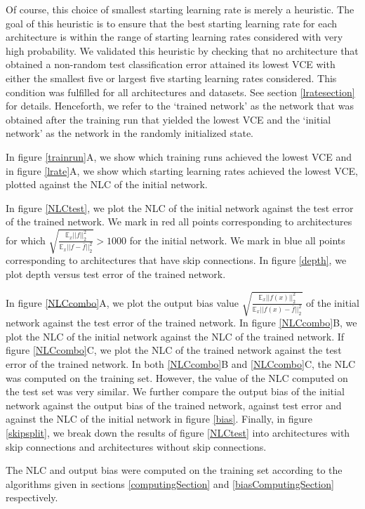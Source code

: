 \documentclass{article} %
\begin{document}
Of course, this choice of smallest starting learning rate is merely a heuristic. The goal of this heuristic is to ensure that the best starting learning rate for each architecture is within the range of starting learning rates considered with very high probability. We validated this heuristic by checking that no architecture that obtained a non-random test classification error attained its lowest VCE with either the smallest five or largest five starting learning rates considered. This condition was fulfilled for all architectures and datasets. See section \ref{lratesection} for details. Henceforth, we refer to the `trained network' as the network that was obtained after the training run that yielded the lowest VCE and the `initial network' as the network in the randomly initialized state.

In figure \ref{trainrun}A, we show which training runs achieved the lowest VCE and in figure \ref{lrate}A, we show which starting learning rates achieved the lowest VCE, plotted against the NLC of the initial network.

In figure \ref{NLCtest}, we plot the NLC of the initial network against the test error of the trained network. We mark in red all points corresponding to architectures for which $\sqrt{\frac{\mathbb{E}_x||f||_2^2}{\mathbb{E}_x||f-\bar{f}||_2^2}} > 1000$ for the initial network. We mark in blue all points corresponding to architectures that have skip connections. In figure \ref{depth}, we plot depth versus test error of the trained network.

In figure \ref{NLCcombo}A, we plot the output bias value $\sqrt{\frac{\mathbb{E}_x||f(x)||_2^2}{\mathbb{E}_x||f(x)-\bar{f}||_2^2}}$ of the initial network against the test error of the trained network. In figure \ref{NLCcombo}B, we plot the NLC of the initial network against the NLC of the trained network. If figure \ref{NLCcombo}C, we plot the NLC of the trained network against the test error of the trained network. In both \ref{NLCcombo}B and \ref{NLCcombo}C, the NLC was computed on the training set. However, the value of the NLC computed on the test set was very similar. We further compare the output bias of the initial network against the output bias of the trained network, against test error and against the NLC of the initial network in figure \ref{bias}. Finally, in figure \ref{skipsplit}, we break down the results of figure \ref{NLCtest} into architectures with skip connections and architectures without skip connections.

The NLC and output bias were computed on the training set according to the algorithms given in sections \ref{computingSection} and \ref{biasComputingSection} respectively.
\end{document}
